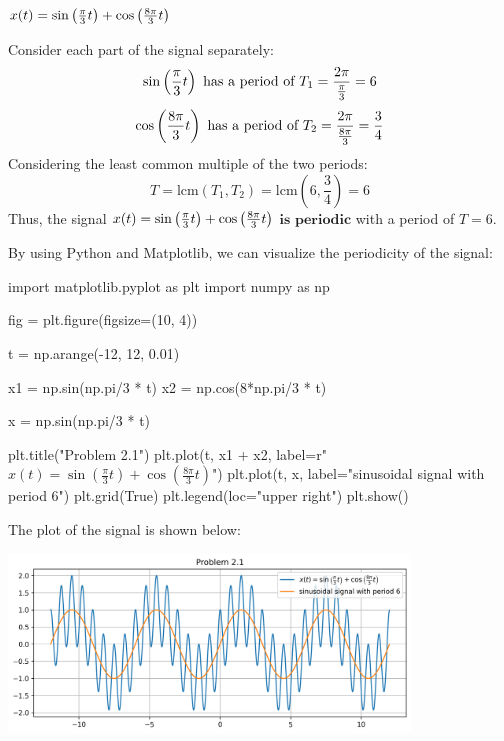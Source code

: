 \documentclass[a4paper, 10pt]{article}
\begin{document}
\begin{subproblems}
    \item \( x(t) = \sin \left( \frac{\pi}{3}t \right) + \cos \left( \frac{8\pi}{3}t \right) \)
\end{subproblems}

\begin{solution}
Consider each part of the signal separately:
\[
\sin \left( \frac{\pi}{3}t \right) \text{ has a period of } T_1 = \frac{2\pi}{\frac{\pi}{3}} = 6
\]
\[
\cos \left( \frac{8\pi}{3}t \right) \text{ has a period of } T_2 = \frac{2\pi}{\frac{8\pi}{3}} = \frac{3}{4}
\]
Considering the least common multiple of the two periods:
\[
T = \text{lcm}(T_1, T_2) = \text{lcm}(6, \frac{3}{4}) = 6
\]
Thus, the signal \( x(t) = \sin \left( \frac{\pi}{3}t \right) + \cos \left( \frac{8\pi}{3}t \right) \) \( \boxed{\textbf{is periodic}} \) with a period of \( \boxed{T = 6} \).

\vspace{5mm}

By using Python and Matplotlib, we can visualize the periodicity of the signal:
\begin{codingbox}
import matplotlib.pyplot as plt
import numpy as np

fig = plt.figure(figsize=(10, 4))

t = np.arange(-12, 12, 0.01)

x1 = np.sin(np.pi/3 * t)
x2 = np.cos(8*np.pi/3 * t)

x = np.sin(np.pi/3 * t)

plt.title("Problem 2.1")
plt.plot(t, x1 + x2, label=r"$x(t) = \sin\left(\frac{\pi}{3}t\right) + \cos\left(\frac{8\pi}{3}t\right)$")
plt.plot(t, x, label="sinusoidal signal with period 6")
plt.grid(True)
plt.legend(loc="upper right")
plt.show()
\end{codingbox}
The plot of the signal is shown below:
\begin{center}
    \includegraphics[width=0.8\textwidth]{images/problem_2_1.png}
\end{center}
\end{solution}
\end{document}

